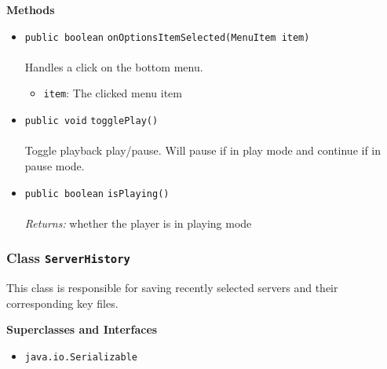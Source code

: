 \textbf{\sffamily Methods}
\begin{itemize}
\item \lstinline|public boolean| \lstinline|onOptionsItemSelected|\lstinline|(MenuItem item)|\\ \\[-0.6em]
Handles a click on the bottom menu.
\begin{itemize}
\item \lstinline|item|: The clicked menu item
\end{itemize}



\item \lstinline|public void| \lstinline|togglePlay|\lstinline|()|\\ \\[-0.6em]
Toggle playback play/pause. Will pause if in play mode and continue if
 in pause mode.



\item \lstinline|public boolean| \lstinline|isPlaying|\lstinline|()|\\ \\[-0.6em]
\emph{Returns:} whether the player is in playing mode



\end{itemize}

\subsubsection{Class \lstinline|ServerHistory|}
This class is responsible for saving recently selected servers
 and their corresponding key files. \\
\noindent\begin{minipage}[t]{5cm}
\vspace{0.3em}
\hspace*{2em}
\vspace{0.3em}
\end{minipage}



\textbf{\sffamily Superclasses and Interfaces}
\begin{itemize}
\item \lstinline|java.io.Serializable|
\end{itemize}



